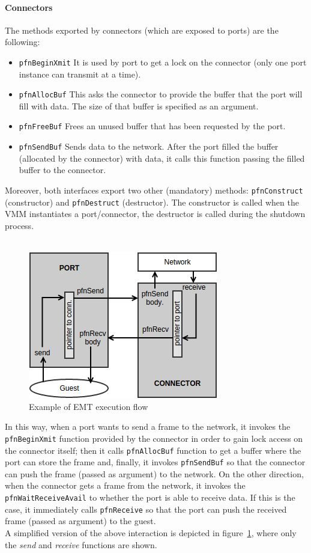 \documentclass[a4paper, 12pt, titlepage]{report}
\begin{document}
\paragraph{Connectors}
The methods exported by connectors (which are exposed to ports) are the following:
\begin{itemize}
\item \texttt{pfnBeginXmit} It is used by port to get a lock on the connector (only one port instance can transmit at a time).
\item \texttt{pfnAllocBuf} This asks the connector to provide the buffer that the port will fill with data. The size of that buffer is specified as an argument.
\item \texttt{pfnFreeBuf} Frees an unused buffer that has been requested by the port.
\item \texttt{pfnSendBuf} Sends data to the network. After the port filled the buffer (allocated by the connector) with data, it calls this function passing the filled buffer to the connector.
\end{itemize}
Moreover, both interfaces export two other (mandatory) methods: \texttt{pfnConstruct} (constructor) and \texttt{pfnDestruct} (destructor). The constructor is called when the VMM instantiates a port/connector, the destructor is called during the shutdown process.
\\
\\
\begin{figure}[!ht]
	\centering
	 	\includegraphics[scale=.75]{img/port_conn_if.png}
	 	\caption{Example of EMT execution flow}
	 	\label{img:port_conn_if}
\end{figure}In this way, when a port wants to send a frame to the network, it invokes the \texttt{pfnBeginXmit} function provided by the connector in order to gain lock access on the connector itself; then it calls \texttt{pfnAllocBuf} function to get a buffer where the port can store the frame and, finally, it invokes \texttt{pfnSendBuf} so that the connector can push the frame (passed as argument) to the network.
On the other direction, when the connector gets a frame from the network, it invokes the \texttt{pfnWaitReceiveAvail} to whether the port is able to receive data. If this is the case, it immediately calls \texttt{pfnReceive} so that the port can push the received frame (passed as argument) to the guest.
\\
A simplified version of the above interaction is depicted in figure~\ref{img:port_conn_if}, where only the \textit{send} and \textit{receive} functions are shown.
\end{document}
